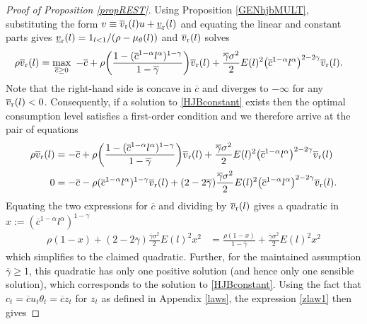 \documentclass[11pt]{article}
\theoremstyle{plain}
\begin{document}
\begin{proof}[Proof of Proposition \ref{propREST}]
Using Proposition \ref{GENhjbMULT}, substituting the form $v \equiv \overline{v}_{\textnormal{r}}(l)u + \underline{v}_{\textnormal{r}}(l)$ and equating the linear and constant parts gives $\underline{v}_{\textnormal{r}}(l) = 1_{l<1}/(\rho - \mu_{\theta}(l))$ and $\overline{v}_{\textnormal{r}}(l)$ solves
\begin{equation}
\begin{aligned}
\rho \overline{v}_{\textnormal{r}}(l) & = \max_{\substack{\overline{c} \geq 0}} \ -\overline{c} + \rho{\left(\frac{1 - (\overline{c}^{1-\alpha}l^{\alpha})^{1-\gamma}}{1-\overline{\gamma}} \right)}\overline{v}_{\textnormal{r}}(l) + \frac{\overline{\gamma}\sigma^2}{2} E(l)^2 {\left(\overline{c}^{1-\alpha}l^{\alpha} \right)}^{2-2\gamma} \overline{v}_{\textnormal{r}}(l).
\label{HJBconstant}
\end{aligned}
\end{equation}
Note that the right-hand side is concave in $\overline{c}$ and diverges to $-\infty$ for any $\overline{v}_{\textnormal{r}}(l) < 0$. Consequently, if a solution to \eqref{HJBconstant} exists then the optimal consumption level satisfies a first-order condition and we therefore arrive at the pair of equations
\begin{align*}
\rho \overline{v}_{\textnormal{r}}(l) & = -\overline{c} + \rho{\left(\frac{1 - (\overline{c}^{1-\alpha}l^{\alpha})^{1-\gamma} }{1-\overline{\gamma}}\right)}\overline{v}_{\textnormal{r}}(l) + \frac{\overline{\gamma}\sigma^2}{2} E(l)^2{\left(\overline{c}^{1-\alpha}l^{\alpha}\right)}^{2-2\gamma}\overline{v}_{\textnormal{r}}(l)
 \\ 0 & = -\overline{c} - \rho(\overline{c}^{1-\alpha}l^{\alpha})^{1-\gamma}\overline{v}_{\textnormal{r}}(l) + (2-2\overline{\gamma})\frac{\overline{\gamma}\sigma^2}{2}E(l)^2{\left(\overline{c}^{1-\alpha}l^{\alpha} \right)}^{2-2\gamma}\overline{v}_{\textnormal{r}}(l).
\end{align*}
Equating the two expressions for $\overline{c}$ and dividing by $\overline{v}_{\textnormal{r}}(l)$ gives a quadratic in $x := (\overline{c}^{1-\alpha}l^{\alpha})^{1-\gamma}$
\begin{align*}
\rho (1 - x) + (2 - 2\overline{\gamma})\frac{\overline{\gamma} \sigma^2}{2} E(l)^2x^2 & = \frac{\rho(1 - x)}{1-\overline{\gamma}} + \frac{\overline{\gamma} \sigma^2}{2} E(l)^2 x^2
\end{align*} 
which simplifies to the claimed quadratic. Further, for the maintained assumption $\overline{\gamma} \geq 1$, this quadratic has only one positive solution (and hence only one sensible solution), which corresponds to the solution to \eqref{HJBconstant}. Using the fact that $c_t = \overline{c}u_t\theta_t = \overline{c}z_t$ for $z_t$ as defined in Appendix \ref{laws}, the expression \eqref{zlaw1} then gives

\end{proof}
\end{document}
